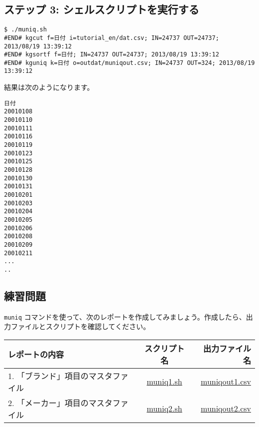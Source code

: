 \subsection*{ステップ 3: シェルスクリプトを実行する}

\begin{verbatim}
$ ./muniq.sh 
#END# kgcut f=日付 i=tutorial_en/dat.csv; IN=24737 OUT=24737; 2013/08/19 13:39:12
#END# kgsortf f=日付; IN=24737 OUT=24737; 2013/08/19 13:39:12
#END# kguniq k=日付 o=outdat/muniqout.csv; IN=24737 OUT=324; 2013/08/19 13:39:12
\end{verbatim}

\noindent
結果は次のようになります。

\begin{verbatim}
日付
20010108
20010110
20010111
20010116
20010119
20010123
20010125
20010128
20010130
20010131
20010201
20010203
20010204
20010205
20010206
20010208
20010209
20010211
...
..
\end{verbatim}



\subsection{練習問題}

\verb|muniq| コマンドを使って、次のレポートを作成してみましょう。作成したら、出力ファイルとスクリプトを確認してください。

\begin{table}[htbp]
{\small
\begin{tabular}{ l | c || r }
\hline
\textbf{レポートの内容}   & \textbf{スクリプト名} & \textbf{出力ファイル名}  \\
\hline
1. 「ブランド」項目のマスタファイル & \href{exercise/muniq1.sh}{muniq1.sh} & \href{exercise/outdat/muniqout1.csv}{muniqout1.csv} \\
2. 「メーカー」項目のマスタファイル & \href{exercise/muniq2.sh}{muniq2.sh} & \href{exercise/outdat/muniqout2.csv}{muniqout2.csv} \\


\hline
\end{tabular} 
}
\end{table} 


%
